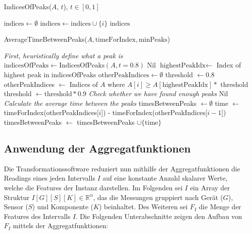 \begin{algorithm}
    \caption{IndicesOfPeaks($A$, $t$), $t \in [0,1]$}
    \label{algo:indicesOfPeaks}
    \begin{algorithmic}
        \State $\text{indices} \gets \emptyset$
                \State $\text{indices} \gets \text{indices} \cup \{i\}$
            \EndIf
        \EndFor
        \State \Return $\text{indices}$
    \end{algorithmic}
\end{algorithm}

\begin{algorithm}
    \caption{AverageTimeBetweenPeaks($A, \text{timeForIndex}, \text{minPeaks}$)}
    \label{algo:avgTimeBetweenPeaks}
    \begin{algorithmic}
        \State \LeftComment \textit{First, heuristically define what a peak is}
        \State $\text{indicesOfPeaks} \gets \text{IndicesOfPeaks}(A, t = 0.8)$
            \State \Return Nil
        \EndIf
        \State $\text{highestPeakIdx} \gets$ Index of highest peak in indicesOfPeaks
        \State {}
        \State $\text{otherPeakIndices} \gets \emptyset$
        \State threshold $\gets 0.8$
        \Repeat
            \State otherPeakIndices $\gets$ Indices of $A$ where $A[i] \geq A[\text{highestPeakIdx}] * $ threshold
            \State threshold $\gets \text{threshold} * 0.9$
        \State \LeftComment \textit{Check whether we have found enough peaks}
            \State \Return Nil
        \EndIf
        \State \LeftComment \textit{Calculate the average time between the peaks}
        \State timesBetweenPeaks $\gets \emptyset$
            \State time $\gets$ timeForIndex(otherPeakIndices[$i$]) - timeForIndex(otherPeakIndices[$i - 1$])
            \State timesBetweenPeaks $\gets$ timesBetweenPeaks $\cup \{\text{time}\}$
        \EndFor
        \State \Return {}
    \end{algorithmic}
\end{algorithm}

\subsection{Anwendung der Aggregatfunktionen}
Die Transformationssoftware reduziert nun mithilfe der Aggregatfunktionen die Readings eines jeden Intervalls $I$ auf eine konstante Anzahl skalarer Werte, welche die Features der Instanz darstellen. Im Folgenden sei $I$ ein Array der Struktur $I[G][S][K] \in \mathbb{R}^\alpha$, das die Messungen gruppiert nach Gerät ($G$), Sensor ($S$) und Komponente ($K$) beinhaltet. Des Weiteren sei $F_I$ die Menge der Features des Intervalls $I$. Die Folgenden Unterabschnitte zeigen den Aufbau von $F_I$ mittels der Aggregatfunktionen:
